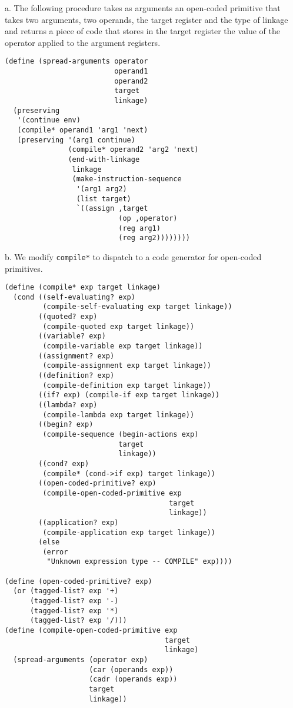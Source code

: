 \documentclass[a4paper,12pt]{article}
\newcommand{\subpar}[1]{\medskip \noindent #1.}
\begin{document}
\subpar{a} The following procedure takes as arguments an open-coded
primitive that takes two arguments, two operands, the target register
and the type of linkage and returns a piece of code that stores in the
target register the value of the operator applied to the argument
registers.

\begin{lstlisting}
(define (spread-arguments operator
                          operand1
                          operand2
                          target
                          linkage)
  (preserving
   '(continue env)
   (compile* operand1 'arg1 'next)
   (preserving '(arg1 continue)
               (compile* operand2 'arg2 'next)
               (end-with-linkage
                linkage
                (make-instruction-sequence
                 '(arg1 arg2)
                 (list target)
                 `((assign ,target
                           (op ,operator)
                           (reg arg1)
                           (reg arg2))))))))
\end{lstlisting}

\subpar{b}  We modify \lstinline!compile*! to dispatch to a code
generator for open-coded primitives.

\begin{lstlisting}
(define (compile* exp target linkage)
  (cond ((self-evaluating? exp)
         (compile-self-evaluating exp target linkage))
        ((quoted? exp)
         (compile-quoted exp target linkage))
        ((variable? exp)
         (compile-variable exp target linkage))
        ((assignment? exp)
         (compile-assignment exp target linkage))
        ((definition? exp)
         (compile-definition exp target linkage))
        ((if? exp) (compile-if exp target linkage))
        ((lambda? exp)
         (compile-lambda exp target linkage))
        ((begin? exp)
         (compile-sequence (begin-actions exp)
                           target
                           linkage))
        ((cond? exp)
         (compile* (cond->if exp) target linkage))
        ((open-coded-primitive? exp)
         (compile-open-coded-primitive exp
                                       target
                                       linkage))
        ((application? exp)
         (compile-application exp target linkage))
        (else
         (error
          "Unknown expression type -- COMPILE" exp))))

(define (open-coded-primitive? exp)
  (or (tagged-list? exp '+)
      (tagged-list? exp '-)
      (tagged-list? exp '*)
      (tagged-list? exp '/)))
(define (compile-open-coded-primitive exp
                                      target
                                      linkage)
  (spread-arguments (operator exp)
                    (car (operands exp))
                    (cadr (operands exp))
                    target
                    linkage))
\end{lstlisting}
\end{document}
